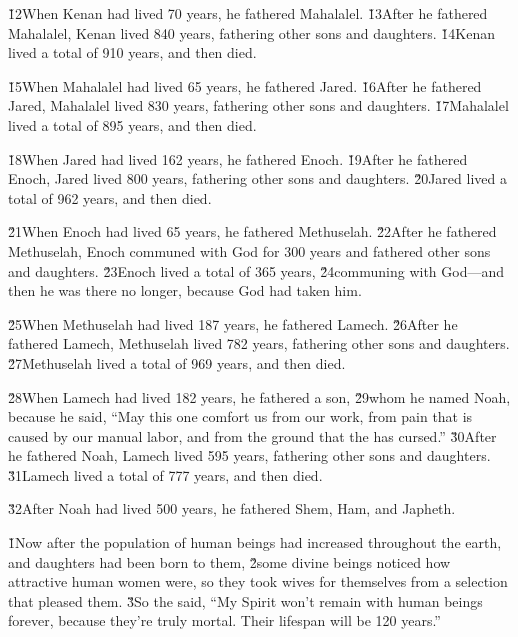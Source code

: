 \v{12}When Kenan had lived 70 years, he fathered Mahalalel. \v{13}After he fathered Mahalalel, Kenan lived 840 years, fathering other sons and daughters. \v{14}Kenan lived a total of 910 years, and then died.

\v{15}When Mahalalel had lived 65 years, he fathered Jared. \v{16}After he fathered Jared, Mahalalel lived 830 years, fathering other sons and daughters. \v{17}Mahalalel lived a total of 895 years, and then died.

\v{18}When Jared had lived 162 years, he fathered Enoch. \v{19}After he fathered Enoch, Jared lived 800 years, fathering other sons and daughters. \v{20}Jared lived a total of 962 years, and then died.

\v{21}When Enoch had lived 65 years, he fathered Methuselah. \v{22}After he fathered Methuselah, Enoch communed with God for 300 years and fathered other sons and daughters. \v{23}Enoch lived a total of 365 years, \v{24}communing with God---and then he was there no longer, because God had taken him.

\v{25}When Methuselah had lived 187 years, he fathered Lamech. \v{26}After he fathered Lamech, Methuselah lived 782 years, fathering other sons and daughters. \v{27}Methuselah lived a total of 969 years, and then died.

\v{28}When Lamech had lived 182 years, he fathered a son, \v{29}whom he named Noah, because he said, ``May this one comfort us from our work, from pain that is caused by our manual labor, and from the ground that the  has cursed.'' \v{30}After he fathered Noah, Lamech lived 595 years, fathering other sons and daughters. \v{31}Lamech lived a total of 777 years, and then died.

\v{32}After Noah had lived 500 years, he fathered Shem, Ham, and Japheth.

\v{1}Now after the population of human beings had increased throughout the earth, and daughters had been born to them, \v{2}some divine beings noticed how attractive human women were, so they took wives for themselves from a selection that pleased them. \v{3}So the  said, ``My Spirit won't remain with human beings forever, because they're truly mortal. Their lifespan will be 120 years.''

